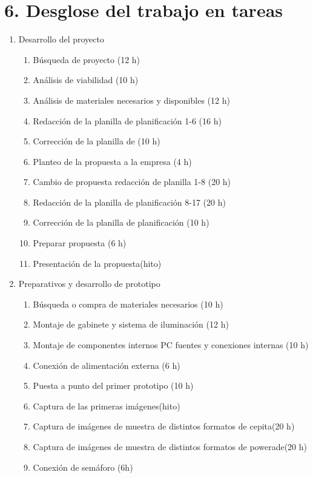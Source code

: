 \documentclass[11pt]{charter}
\begin{document}
\newpage
\section{6. Desglose del trabajo en tareas}
\label{sec:wbs}


\begin{enumerate}
\item Desarrollo del proyecto 
	\begin{enumerate}
	\item Búsqueda de proyecto (12 h)
	\item Análisis de viabilidad (10 h)
	\item Análisis de materiales necesarios y disponibles (12 h)
	\item Redacción de la planilla de planificación 1-6 (16 h)
	\item Corrección de la planilla de  (10 h)
	\item Planteo de la propuesta a la empresa (4 h)
	\item Cambio de propuesta redacción de planilla 1-8 (20 h)
	\item Redacción de la planilla de planificación 8-17 (20 h)
	\item Corrección de la planilla de planificación (10 h)
	\item Preparar propuesta (6 h)
	\item Presentación de la propuesta(hito)
	\end{enumerate}
\item Preparativos y desarrollo de prototipo
\begin{enumerate}
	\item Búsqueda o compra de materiales necesarios (10 h)
	\item Montaje de gabinete y sistema de iluminación (12 h)
	\item Montaje de componentes internos PC fuentes y conexiones internas (10 h)
	\item Conexión de alimentación externa (6 h)
	\item Puesta a punto del primer prototipo (10 h)
	\item Captura de las primeras imágenes(hito)
	\item Captura de imágenes de muestra de distintos formatos de cepita(20 h) 
	\item Captura de imágenes de muestra de distintos formatos de powerade(20 h)
	\item Conexión de semáforo (6h)

\end{enumerate}
\end{enumerate}
\end{document}
